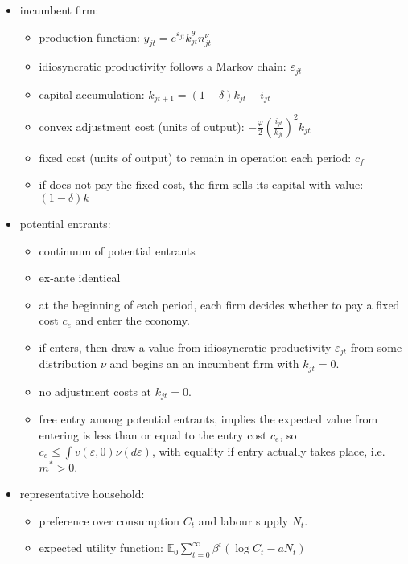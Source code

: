 \documentclass[12pt]{article}
\begin{document}
    \begin{itemize}

        \item incumbent firm:
        \begin{itemize}
          \item production function: $y_{j t}=e^{\varepsilon_{j t}} k_{j t}^{\theta} n_{j t}^{\nu}$
          \item idiosyncratic productivity follows a Markov chain: $\varepsilon_{j t}$
          \item capital accumulation: $k_{j t+1}=(1-\delta) k_{j t}+i_{j t}$
          \item convex adjustment cost (units of output): $-\frac{\varphi}{2}\left(\frac{i_{j t}}{k_{j t}}\right)^{2} k_{j t}$
          \item fixed cost (units of output) to remain in operation each period: $c_{f}$
          \item if does not pay the fixed cost, the firm sells its capital with value: $(1-\delta) k$
        \end{itemize}

        \item potential entrants:
        \begin{itemize}
          \item continuum of potential entrants
          \item ex-ante identical
          \item at the beginning of each period, each firm decides whether to pay a fixed cost $c_e$ and enter the economy.
          \item if enters, then draw a value from idiosyncratic productivity $\varepsilon_{j t}$ from some distribution $\nu$ and begins an an incumbent firm with $k_{jt} = 0$.
          \item no adjustment costs at $k_{jt} = 0$.
          \item free entry among potential entrants, implies the expected value from entering is less than or equal to the entry cost $c_e$, so $c_{e} \leq \int v(\varepsilon, 0) \nu(d \varepsilon)$, with equality if entry actually takes place, i.e. $m^{*}>0$.
        \end{itemize}

      \item representative household:
      \begin{itemize}
        \item preference over consumption $C_t$ and labour supply $N_t$.
        \item expected utility function: $\mathbb{E}_{0} \sum_{t=0}^{\infty} \beta^{t}\left(\log C_{t}-a N_{t}\right)$
      \end{itemize}


\end{itemize}
\end{document}
